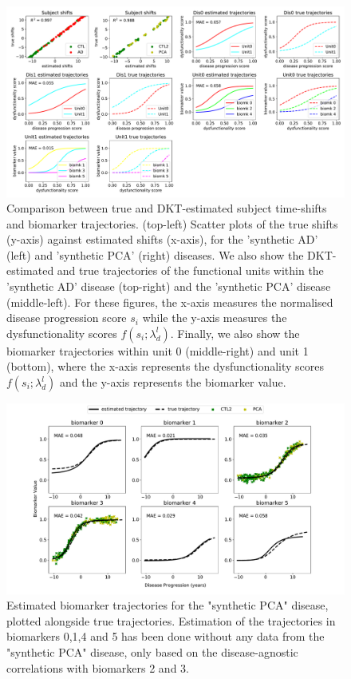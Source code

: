 \begin{figure}
\includegraphics[width=\textwidth]{images/compTrueParams101_synth1_JMD.pdf}
 \caption[DKT Simulation Results - Comparison between true and DKT-estimated biomarker trajectories and subject time-shifts.]{Comparison between true and DKT-estimated subject time-shifts and biomarker trajectories. (top-left) Scatter plots of the true shifts (y-axis) against estimated shifts (x-axis), for the 'synthetic AD' (left) and 'synthetic PCA' (right) diseases. We also show the DKT-estimated and true trajectories of the functional units within the 'synthetic AD' disease (top-right) and the 'synthetic PCA' disease (middle-left). For these figures, the x-axis measures the normalised disease progression score $s_i$ while the y-axis measures the dysfunctionality scores $f(s_i;\lambda_d^l)$. Finally, we also show the biomarker trajectories within unit 0 (middle-right) and unit 1 (bottom), where the x-axis represents the dysfunctionality scores $f(s_i;\lambda_d^l)$ and the y-axis represents the biomarker value.}
 \label{fig:dktSynthTrajCompTrue}
\end{figure}

\begin{figure}
\includegraphics[width=\textwidth]{images/trajDisSpaceDis1_101_synth1_JMD.pdf}
 \caption[Estimated biomarker trajectories for the "synthetic PCA" disease, plotted alongside true trajectories]{Estimated biomarker trajectories for the "synthetic PCA" disease, plotted alongside true trajectories. Estimation of the trajectories in biomarkers 0,1,4 and 5 has been done without any data from the "synthetic PCA" disease, only based on the disease-agnostic correlations with biomarkers 2 and 3.}
 \label{fig:dktSynthTrajDrcSpace}
\end{figure}


